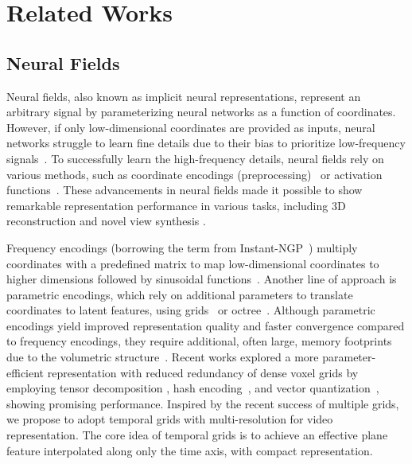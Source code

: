 \documentclass[sigconf]{acmart}
\begin{document}
\section{Related Works}
\subsection{Neural Fields}
Neural fields, also known as implicit neural representations, represent an arbitrary signal by parameterizing neural networks as a function of coordinates.
However, if only low-dimensional coordinates are provided as inputs, neural networks struggle to learn fine details due to their bias to prioritize low-frequency signals~\cite{spectral}.
To successfully learn the high-frequency details, neural fields rely on various methods, such as coordinate encodings (preprocessing)~\cite{nerf,fourier,mipnerf,instant_ngp,VQAD,tensorf} or activation functions~\cite{SIREN,GARF,beyond_periodicity}.
These advancements in neural fields made it possible to show remarkable representation performance in various tasks, including 3D reconstruction \cite{loc_grid_3dscene,conv_occu,geo_tree} and novel view synthesis \cite{nerf,nerfinwild,dir_v_syn}.

Frequency encodings (borrowing the term from Instant-NGP~\cite{instant_ngp}) multiply coordinates with a predefined matrix to map low-dimensional coordinates to higher dimensions followed by sinusoidal functions~\cite{nerf,fourier,mipnerf}.
Another line of approach is parametric encodings, which rely on additional parameters to translate coordinates to latent features, using grids~\cite{loc_grid_3dscene,nsvf,conv_occu,dir_v_syn, plenoxels,instant_ngp,VQAD,tensorf} or octree~\cite{geo_tree,PlenOctrees,mvsoct}.
Although parametric encodings yield improved representation quality and faster convergence compared to frequency encodings, they require additional, often large, memory footprints due to the volumetric structure~\cite{instant_ngp}.
Recent works explored a more parameter-efficient representation with reduced redundancy of dense voxel grids by employing tensor decomposition \cite{tensorf}, hash encoding~\cite{instant_ngp}, and vector quantization~\cite{VQAD}, showing promising performance.
Inspired by the recent success of multiple grids, we propose to adopt temporal grids with multi-resolution for video representation.
The core idea of temporal grids is to achieve an effective plane feature interpolated along only the time axis, with compact representation.
\end{document}
